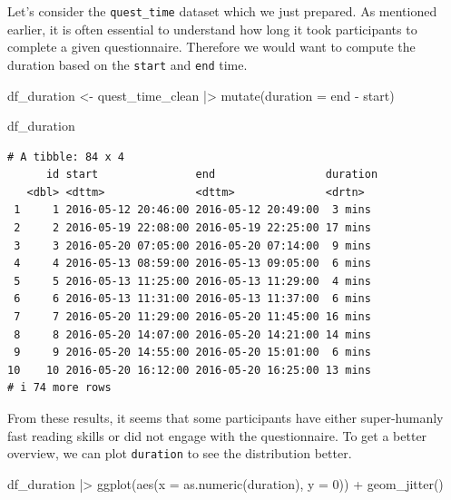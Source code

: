\documentclass[
  letterpaper,
]{krantz}
\makeatletter
\newenvironment{Shaded}{\begin{snugshade}}{\end{snugshade}}
\newcommand{\AttributeTok}[1]{\textcolor[rgb]{0.40,0.45,0.13}{#1}}
\newcommand{\DecValTok}[1]{\textcolor[rgb]{0.68,0.00,0.00}{#1}}
\newcommand{\FunctionTok}[1]{\textcolor[rgb]{0.28,0.35,0.67}{#1}}
\newcommand{\NormalTok}[1]{\textcolor[rgb]{0.00,0.23,0.31}{#1}}
\newcommand{\OtherTok}[1]{\textcolor[rgb]{0.00,0.23,0.31}{#1}}
\newcommand{\SpecialCharTok}[1]{\textcolor[rgb]{0.37,0.37,0.37}{#1}}
\newenvironment{kframe}{%
\medskip{}
\setlength{\fboxsep}{.8em}
 \def\at@end@of@kframe{}%
 \ifinner\ifhmode%
  \def\at@end@of@kframe{\end{minipage}}%
  \begin{minipage}{\columnwidth}%
 \fi\fi%
 \def\FrameCommand##1{\hskip\@totalleftmargin \hskip-\fboxsep
 \colorbox{shadecolor}{##1}\hskip-\fboxsep
     \hskip-\linewidth \hskip-\@totalleftmargin \hskip\columnwidth}%
 \MakeFramed {\advance\hsize-\width
   \@totalleftmargin\z@ \linewidth\hsize
   \@setminipage}}%
 {\par\unskip\endMakeFramed%
 \at@end@of@kframe}
\renewenvironment{Shaded}{\begin{kframe}}{\end{kframe}}
\makeatother
\begin{document}
Let's consider the \texttt{quest\_time} dataset which we just prepared.
As mentioned earlier, it is often essential to understand how long it
took participants to complete a given questionnaire. Therefore we would
want to compute the duration based on the \texttt{start} and
\texttt{end} time.

\begin{Shaded}
\begin{Highlighting}[]
\NormalTok{df\_duration }\OtherTok{\textless{}{-}}
\NormalTok{  quest\_time\_clean }\SpecialCharTok{|\textgreater{}}
  \FunctionTok{mutate}\NormalTok{(}\AttributeTok{duration =}\NormalTok{ end }\SpecialCharTok{{-}}\NormalTok{ start)}

\NormalTok{df\_duration}
\end{Highlighting}
\end{Shaded}

\begin{verbatim}
# A tibble: 84 x 4
      id start               end                 duration
   <dbl> <dttm>              <dttm>              <drtn>  
 1     1 2016-05-12 20:46:00 2016-05-12 20:49:00  3 mins 
 2     2 2016-05-19 22:08:00 2016-05-19 22:25:00 17 mins 
 3     3 2016-05-20 07:05:00 2016-05-20 07:14:00  9 mins 
 4     4 2016-05-13 08:59:00 2016-05-13 09:05:00  6 mins 
 5     5 2016-05-13 11:25:00 2016-05-13 11:29:00  4 mins 
 6     6 2016-05-13 11:31:00 2016-05-13 11:37:00  6 mins 
 7     7 2016-05-20 11:29:00 2016-05-20 11:45:00 16 mins 
 8     8 2016-05-20 14:07:00 2016-05-20 14:21:00 14 mins 
 9     9 2016-05-20 14:55:00 2016-05-20 15:01:00  6 mins 
10    10 2016-05-20 16:12:00 2016-05-20 16:25:00 13 mins 
# i 74 more rows
\end{verbatim}

From these results, it seems that some participants have either
super-humanly fast reading skills or did not engage with the
questionnaire. To get a better overview, we can plot \texttt{duration}
to see the distribution better.

\begin{Shaded}
\begin{Highlighting}[]
\NormalTok{df\_duration }\SpecialCharTok{|\textgreater{}}
  \FunctionTok{ggplot}\NormalTok{(}\FunctionTok{aes}\NormalTok{(}\AttributeTok{x =} \FunctionTok{as.numeric}\NormalTok{(duration),}
             \AttributeTok{y =} \DecValTok{0}\NormalTok{)) }\SpecialCharTok{+}
  \FunctionTok{geom\_jitter}\NormalTok{()}
\end{Highlighting}
\end{Shaded}
\end{document}
